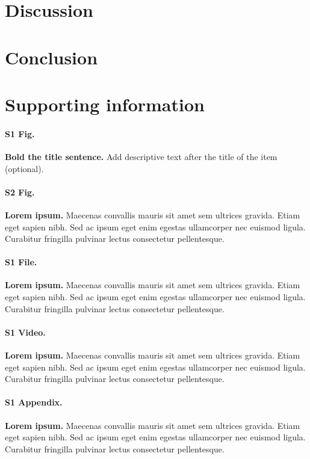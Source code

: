 \documentclass[10pt,letterpaper]{article}
\begin{document}
\section*{Discussion}


\section*{Conclusion}



\section*{Supporting information}

\paragraph*{S1 Fig.}
\label{S1_Fig}
{\bf Bold the title sentence.} Add descriptive text after the title of the item (optional).

\paragraph*{S2 Fig.}
\label{S2_Fig}
{\bf Lorem ipsum.} Maecenas convallis mauris sit amet sem ultrices gravida. Etiam eget sapien nibh. Sed ac ipsum eget enim egestas ullamcorper nec euismod ligula. Curabitur fringilla pulvinar lectus consectetur pellentesque.

\paragraph*{S1 File.}
\label{S1_File}
{\bf Lorem ipsum.}  Maecenas convallis mauris sit amet sem ultrices gravida. Etiam eget sapien nibh. Sed ac ipsum eget enim egestas ullamcorper nec euismod ligula. Curabitur fringilla pulvinar lectus consectetur pellentesque.

\paragraph*{S1 Video.}
\label{S1_Video}
{\bf Lorem ipsum.}  Maecenas convallis mauris sit amet sem ultrices gravida. Etiam eget sapien nibh. Sed ac ipsum eget enim egestas ullamcorper nec euismod ligula. Curabitur fringilla pulvinar lectus consectetur pellentesque.

\paragraph*{S1 Appendix.}
\label{S1_Appendix}
{\bf Lorem ipsum.} Maecenas convallis mauris sit amet sem ultrices gravida. Etiam eget sapien nibh. Sed ac ipsum eget enim egestas ullamcorper nec euismod ligula. Curabitur fringilla pulvinar lectus consectetur pellentesque.
\end{document}
